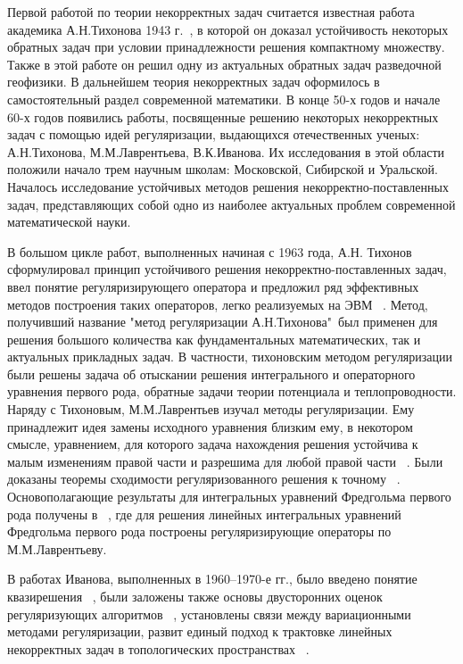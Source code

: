 \documentclass[14pt]{article}
\begin{document}
Первой работой по теории некорректных задач считается известная работа академика А.Н.Тихонова 1943 г.~\cite{Tikh1943}, в которой он доказал устойчивость некоторых обратных задач при условии принадлежности решения компактному множеству. Также в этой работе он решил одну из актуальных обратных задач разведочной геофизики. В дальнейшем теория некорректных задач оформилось в самостоятельный раздел современной математики. В конце 50-х годов и начале 60-х годов появились работы, посвященные решению некоторых некорректных задач с помощью идей регуляризации, выдающихся отечественных ученых: А.Н.Тихонова, М.М.Лаврентьева, В.К.Иванова. Их исследования в этой области положили начало трем научным школам:  Московской, Сибирской и Уральской.
Началось исследование устойчивых методов решения некорректно-поставленных задач, представляющих собой одно из наиболее актуальных проблем современной математической науки.

В большом цикле работ, выполненных начиная с 1963 года, А.Н. Тихонов сформулировал принцип устойчивого решения некорректно-поставленных задач, ввел понятие регуляризирующего оператора и предложил ряд эффективных методов построения таких операторов, легко реализуемых на ЭВМ ~\cite{Tikh1963_1, Tikh1963_2, TikhGlas1965, TikhArs1986}. Метод, получивший название "метод регуляризации А.Н.Тихонова"\, был применен для решения большого количества как фундаментальных математических, так и актуальных прикладных задач. В частности, тихоновским методом регуляризации были решены задача об отыскании решения интегрального и операторного уравнения первого рода, обратные задачи теории потенциала и теплопроводности. Наряду с Тихоновым, М.М.Лаврентьев изучал методы регуляризации. Ему принадлежит идея замены исходного уравнения близким ему, в некотором смысле, уравнением, для которого задача нахождения решения устойчива к малым изменениям правой части и разрешима для любой правой части ~\cite{Lavr1962}. Были доказаны теоремы сходимости регуляризованного решения к точному ~\cite{Lavr1956}. Основополагающие  результаты  для  интегральных  уравнений  Фредгольма  первого  рода  получены  в  ~\cite{Lavr1959, Lavr1963, LavrVas1966, LavrRomShi1980},  где  для  решения  линейных  интегральных  уравнений  Фредгольма  первого  рода  построены  регуляризирующие  операторы  по  М.М.Лаврентьеву. 

В работах Иванова, выполненных в 1960–1970-е гг., было введено понятие квазирешения ~\cite{Iv1962_2, Iv1963}, были заложены также основы двусторонних оценок регуляризующих алгоритмов ~\cite{Iv1966}, установлены связи между вариационными методами регуляризации, развит единый подход к трактовке линейных некорректных задач в топологических пространствах ~\cite{Iv1967}. 
\end{document}
